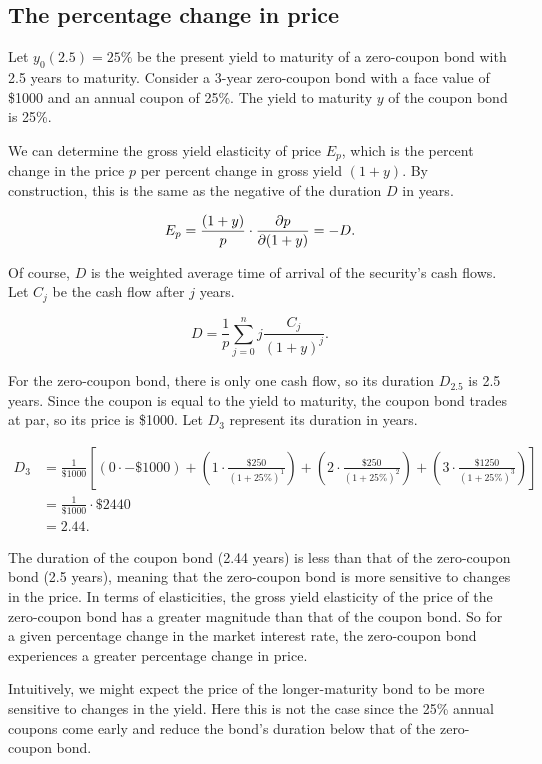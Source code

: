 \documentclass[12pt]{article}
\begin{document}
\subsection{The percentage change in price}
Let $y_0(2.5)=25\%$ be the present yield to maturity of a zero-coupon bond with 2.5 years to maturity. Consider a 3-year zero-coupon bond with a face value of \$1000 and an annual coupon of 25\%. The yield to maturity $y$ of the coupon bond is 25\%.

We can determine the gross yield elasticity of price $E_p$, which is the percent change in the price $p$ per percent change in gross yield $(1+y)$. By construction, this is the same as the negative of the duration $D$ in years.

\[E_p=\frac{(1+y)}{p}\cdot\pdv{p}{(1+y)}=-D.\]

Of course, $D$ is the weighted average time of arrival of the security's cash flows. Let $C_j$ be the cash flow after $j$ years.

\[D=\frac{1}{p}\sum_{j=0}^n{j\frac{C_j}{(1+y)^j}}.\]

For the zero-coupon bond, there is only one cash flow, so its duration $D_{2.5}$ is 2.5 years. Since the coupon is equal to the yield to maturity, the coupon bond trades at par, so its price is \$1000. Let $D_3$ represent its duration in years.

\begin{align*}
D_3
&=\frac{1}{\$1000}\left[(0\cdot-\$1000)+\left(1\cdot\frac{\$250}{(1+25\%)^1}\right)+\left(2\cdot\frac{\$250}{(1+25\%)^2}\right)+\left(3\cdot\frac{\$1250}{(1+25\%)^3}\right)\right]\\
&=\frac{1}{\$1000}\cdot\$2440\\
&=2.44.
\end{align*}

The duration of the coupon bond (2.44 years) is less than that of the zero-coupon bond (2.5 years), meaning that the zero-coupon bond is more sensitive to changes in the price. In terms of elasticities, the gross yield elasticity of the price of the zero-coupon bond has a greater magnitude than that of the coupon bond. So for a given percentage change in the market interest rate, the zero-coupon bond experiences a greater percentage change in price.

Intuitively, we might expect the price of the longer-maturity bond to be more sensitive to changes in the yield. Here this is not the case since the 25\% annual coupons come early and reduce the bond's duration below that of the zero-coupon bond.
\end{document}
